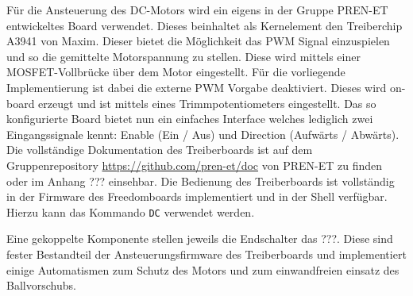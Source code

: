 Für die Ansteuerung des DC-Motors wird ein eigens in der Gruppe
PREN-ET entwickeltes Board verwendet. Dieses beinhaltet als
Kernelement den Treiberchip A3941 von Maxim. Dieser bietet die
Möglichkeit das PWM Signal einzuspielen und so die gemittelte
Motorspannung zu stellen. Diese wird mittels einer
MOSFET-Vollbrücke über dem Motor eingestellt. Für die vorliegende
Implementierung ist dabei die externe PWM Vorgabe deaktiviert.
Dieses wird on-board erzeugt und ist mittels eines
Trimmpotentiometers eingestellt. Das so konfigurierte Board
bietet nun ein einfaches Interface welches lediglich zwei
Eingangssignale kennt: Enable (Ein / Aus) und Direction (Aufwärts
/ Abwärts).
%
%
Die vollständige Dokumentation des Treiberboards ist auf dem
Gruppenrepository \url{https://github.com/pren-et/doc}
von PREN-ET zu finden oder im Anhang ??? einsehbar. Die Bedienung
des Treiberboards ist vollständig in der Firmware des
Freedomboards implementiert und in der Shell verfügbar. Hierzu kann
das Kommando \verb!DC! verwendet werden.

Eine gekoppelte Komponente stellen jeweils die Endschalter das
???. Diese sind fester Bestandteil der Ansteuerungsfirmware des
Treiberboards und implementiert einige Automatismen zum Schutz
des Motors und zum einwandfreien einsatz des Ballvorschubs.
